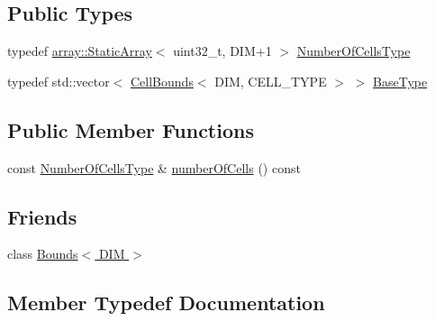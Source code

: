 \subsection*{Public Types}
\begin{DoxyCompactItemize}
\item 
typedef \hyperlink{namespacenifty_1_1array_a683f151f19c851754e0c6d55ed16a0c2}{array\+::\+Static\+Array}$<$ uint32\+\_\+t, D\+I\+M+1 $>$ \hyperlink{classnifty_1_1cgp_1_1CellBoundsVector_a4db6e267b7ec9e9bfd2db914354c49f9}{Number\+Of\+Cells\+Type}
\item 
typedef std\+::vector$<$ \hyperlink{classnifty_1_1cgp_1_1CellBounds}{Cell\+Bounds}$<$ D\+I\+M, C\+E\+L\+L\+\_\+\+T\+Y\+P\+E $>$ $>$ \hyperlink{classnifty_1_1cgp_1_1CellBoundsVector_ae9467b3782214101f6ca95a0219bbbb6}{Base\+Type}
\end{DoxyCompactItemize}
\subsection*{Public Member Functions}
\begin{DoxyCompactItemize}
\item 
const \hyperlink{classnifty_1_1cgp_1_1CellBoundsVector_a4db6e267b7ec9e9bfd2db914354c49f9}{Number\+Of\+Cells\+Type} \& \hyperlink{classnifty_1_1cgp_1_1CellBoundsVector_a8ee7d5fa77d9e2c0239f37834e459937}{number\+Of\+Cells} () const 
\end{DoxyCompactItemize}
\subsection*{Friends}
\begin{DoxyCompactItemize}
\item 
class \hyperlink{classnifty_1_1cgp_1_1CellBoundsVector_a88cb0f4daae12ff33da3c2a17786cd08}{Bounds$<$ D\+I\+M $>$}
\end{DoxyCompactItemize}


\subsection{Member Typedef Documentation}
\hypertarget{classnifty_1_1cgp_1_1CellBoundsVector_ae9467b3782214101f6ca95a0219bbbb6}{}

